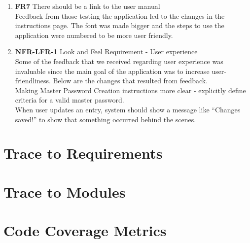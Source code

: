 \documentclass[12pt, titlepage]{article}
\begin{document}
	\begin{enumerate}[resume]

		\item \textbf{FR7} There should be a link to the user manual\\
		Feedback from those testing the application led to the changes in the instructions page. The font was made bigger and the steps to use the application were numbered to be more user friendly.
	
		\item \textbf{NFR-LFR-1} Look and Feel Requirement - User experience\\
		Some of the feedback that we received regarding user experience was invaluable since the main goal of the application was to increase user-friendliness. Below are the changes that resulted from feedback.\\
		Making Master Password Creation instructions more clear - explicitly define criteria for a valid master password.\\
		When user updates an entry, system should show a message like “Changes saved!” to show that something occurred behind the scenes.

	\end{enumerate}


\section{Trace to Requirements}
		
\section{Trace to Modules}		

\section{Code Coverage Metrics}




\end{document}
